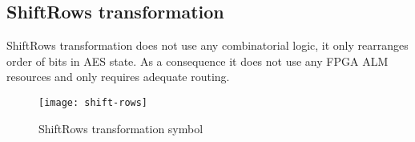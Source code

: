 \subsection{ShiftRows transformation}

ShiftRows transformation does not use any combinatorial logic, it only rearranges order of bits in AES state. As a consequence it does not use any FPGA ALM resources and only requires adequate routing.

\begin{figure}[!h]
\centering
\texttt{[image: shift-rows]}
\caption{ShiftRows transformation symbol}
\label{fig:key-expansion}
\end{figure}